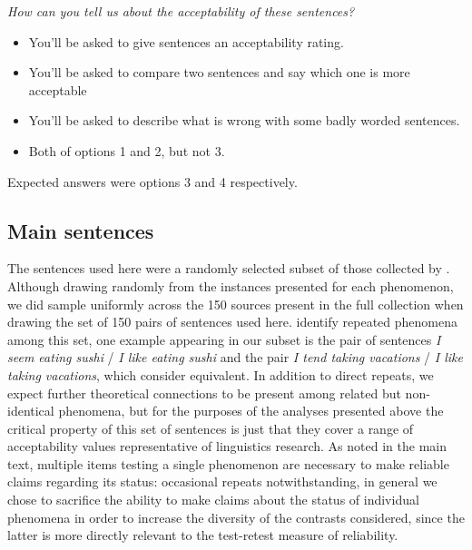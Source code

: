 \documentclass[doc]{apa6}
\begin{document}
{\it How can you tell us about the acceptability of these sentences?}
\begin{itemize}
\item  You'll be asked to give sentences an acceptability rating.
\item  You'll be asked to compare two sentences and say which one is more acceptable
\item  You'll be asked to describe what is wrong with some badly worded sentences.
\item  Both of options 1 and 2, but not 3.
\end{itemize}

Expected answers were options 3 and 4 respectively.

\subsection*{Main sentences}

The sentences used here were a randomly selected subset of those collected by \citet{sprouse2013formalinformal}.
Although drawing randomly from the instances presented for each phenomenon, we did sample uniformly across the 150 sources present in the full collection when drawing the set of 150 pairs of sentences used here. \citet{sprouse2013formalinformal}
identify repeated phenomena among this set, one example appearing in our subset is the pair of sentences {\it I seem eating sushi} / {\it I like eating sushi} and the pair {\it I tend taking vacations} / {\it I like taking vacations}, which \citet{sprouse2013formalinformal}
consider equivalent. In addition to direct repeats, we expect further theoretical connections to be present among related but non-identical phenomena, but for the purposes of the analyses presented above the critical property of this set of sentences is just that they cover a range of acceptability values representative of linguistics research. As noted in the main text, multiple items testing a single phenomenon are necessary to make reliable claims regarding its status: occasional repeats notwithstanding, in general we chose to sacrifice the ability to make claims about the status of individual phenomena in order to increase the diversity of the contrasts considered, since the latter is more directly relevant to the test-retest measure of reliability.
\end{document}
